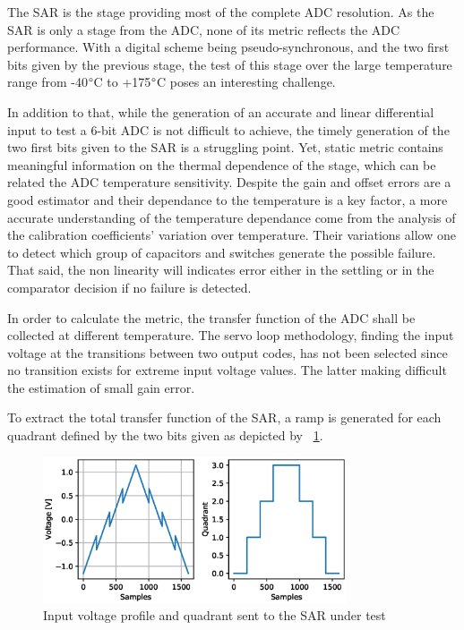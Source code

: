 The SAR is the stage providing most of the complete ADC resolution. As the SAR is only a stage from the ADC, none of its metric reflects the ADC performance. With a digital scheme being pseudo-synchronous, and the two first bits given by the previous stage, the test of this stage over the large temperature range from -40\(\degree \)C to +175\(\degree \)C poses an interesting challenge.

In addition to that, while the generation of an accurate and linear differential input to test a 6-bit ADC is not difficult to achieve, the timely generation of the two first bits given to the SAR is a struggling point. Yet, static metric contains meaningful information on the thermal dependence of the stage, which can be related the ADC temperature sensitivity. Despite the gain and offset errors are a good estimator and their dependance to the temperature is a key factor, a more accurate understanding of the temperature dependance come from the analysis of the calibration coefficients' variation over temperature. Their variations allow one to detect which group of capacitors and switches generate the possible failure. That said, the non linearity will indicates error either in the settling or in the comparator decision if no failure is detected.

In order to calculate the metric, the transfer function of the ADC shall be collected at different temperature. The servo loop methodology, finding the input voltage at the transitions between two output codes, has not been selected since no transition exists for extreme input voltage values. The latter making difficult the estimation of small gain error.

To extract the total transfer function of the SAR, a ramp is generated for each quadrant defined by the two bits given as depicted by \figurename~\ref{fig:sar-test-input}. 

\begin{figure}[htp]
    \centering
    \includegraphics[width=0.8\textwidth]{Chapter5/Figs/sar_test/sar-test-input.eps}
    \caption{Input voltage profile and quadrant sent to the SAR under test}
    \label{fig:sar-test-input}
\end{figure}

